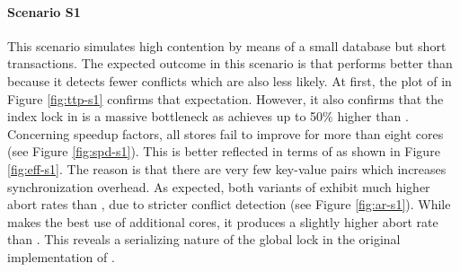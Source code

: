 \clearpage

\paragraph{Scenario S1}


This scenario simulates high contention by means of a small database but short
transactions. The expected outcome in this scenario is that \echo performs
better than \midas because it detects fewer conflicts which are also less
likely. At first, the plot of \ttp in Figure \ref{fig:ttp-s1} confirms that
expectation. However, it also confirms that the index lock in \midas is a
massive bottleneck as \midasopt achieves up to 50\% higher \tput than \echo.
Concerning speedup factors, all stores fail to improve for more than eight cores
(see Figure \ref{fig:spd-s1}). This is better reflected in terms of \eff as
shown in Figure \ref{fig:eff-s1}. The reason is that there are very few
key-value pairs which increases synchronization overhead. As expected, both
variants of \midas exhibit much higher abort rates than \echo, due to stricter
conflict detection (see Figure \ref{fig:ar-s1}). While \midasopt makes the best
use of additional cores, it produces a slightly higher abort rate than \midas.
This reveals a serializing nature of the global lock in the original
implementation of \midas.

